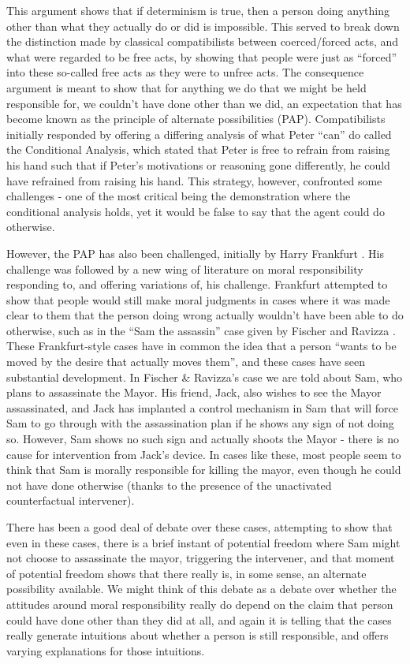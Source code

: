 \documentclass[phd,12pt,oneside,paper=letterpaper]{ubcthesis}
\begin{document}
This argument shows that if determinism is true, then a person doing anything other than what they actually do or did is impossible. This served to break down the distinction made by classical compatibilists between coerced/forced acts, and what were regarded to be free acts, by showing that people were just as ``forced'' into these so-called free acts as they were to unfree acts. The consequence argument is meant to show that for anything we do that we might be held responsible for, we couldn't have done other than we did, an expectation that has become known as the principle of alternate possibilities (PAP). Compatibilists initially responded by offering a differing analysis of what Peter ``can'' do called the Conditional Analysis, which stated that Peter is free to refrain from raising his hand such that if Peter's motivations or reasoning gone differently, he could have refrained from raising his hand. This strategy, however, confronted some challenges - one of the most critical being the demonstration where the conditional analysis holds, yet it would be false to say that the agent could do otherwise.

However, the PAP has also been challenged, initially by Harry Frankfurt \citeyearpar{frankfurt1969}. His challenge was followed by a new wing of literature on moral responsibility responding to, and offering variations of, his challenge. Frankfurt attempted to show that people would still make moral judgments in cases where it was made clear to them that the person doing wrong actually wouldn't have been able to do otherwise, such as in the ``Sam the assassin'' case given by Fischer and Ravizza \citep{fischerravizza1998}. These Frankfurt-style cases have in common the idea that a person ``wants to be moved by the desire that actually moves them'', and these cases have seen substantial development. In Fischer \& Ravizza's case we are told about Sam, who plans to assassinate the Mayor. His friend, Jack, also wishes to see the Mayor assassinated, and Jack has implanted a control mechanism in Sam that will force Sam to go through with the assassination plan if he shows any sign of not doing so. However, Sam shows no such sign and actually shoots the Mayor - there is no cause for intervention from Jack's device. In cases like these, most people seem to think that Sam is morally responsible for killing the mayor, even though he could not have done otherwise (thanks to the presence of the unactivated counterfactual intervener). 

There has been a good deal of debate over these cases, attempting to show that even in these cases, there is a brief instant of potential freedom where Sam might not choose to assassinate the mayor, triggering the intervener, and that moment of potential freedom shows that there really is, in some sense, an alternate possibility available. We might think of this debate as a debate over whether the attitudes around moral responsibility really do depend on the claim that person could have done other than they did at all, and again it is telling that the cases really generate intuitions about whether a person is still responsible, and offers varying explanations for those intuitions. 
\end{document}
